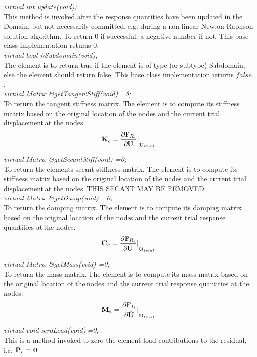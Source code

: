 {\em virtual int update(void);} \\
This method is invoked after the response quantities have been updated
in the Domain, but not necessarily committed, e.g. during a
non-linear Newton-Raphson solution algorithm. To return $0$ if
successful, a negative number if not. This base class implementation returns
$0$. \\

{\em virtual bool isSubdomain(void);} \\
The element is to return true if the element is of type (or subtype)
Subdomain, else the element should return false. This base class
implementation returns $false$. \\


{\em virtual Matrix \&getTangentStiff(void) =0;} \\
To return the tangent stiffness matrix. The element is to compute its
stiffness matrix based on the original location of the nodes and the
current trial displacement at the nodes. \\ 

$$ 
{\bf K}_e = {\frac{\partial {\bf F}_{R_i}}{\partial {\bf U}}
\vert}_{{\bf U}_{trial}}
$$

{\em virtual Matrix \&getSecantStiff(void) =0;} \\
To return the elements secant stiffness matrix. The element is to
compute its stiffness matrix based on the original location of the
nodes and the current trial displacement at the nodes. THIS SECANT MAY
BE REMOVED. \\

{\em virtual Matrix \&getDamp(void) =0;} \\
To return the damping matrix. The element is to compute its
damping matrix based on the original location of the nodes and the
current trial response quantities at the nodes. \\ 

$$ 
{\bf C}_e = {\frac{\partial {\bf F}_{R_i}}{\partial \dot {{\bf U}}}
\vert}_{{\bf U}_{trial}}
$$

{\em virtual Matrix \&getMass(void) =0;} \\
To return the mass matrix. The element is to compute its
mass matrix based on the original location of the nodes and the
current trial response quantities at the nodes. \\ 

$$ 
{\bf M}_e  = {\frac{\partial {\bf F}_{I_i}}{\partial \ddot {{\bf U}}}
\vert}_{{\bf U}_{trial}}
$$

{\em virtual void zeroLoad(void) =0;}\\
This is a method invoked to zero the element load contributions to the
residual, i.e. ${\bf P}_e = {\bf 0}$ \\ 

